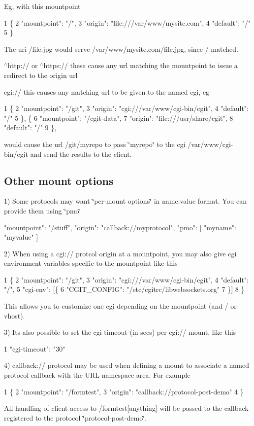 Eg, with this mountpoint 
\begin{DoxyCode}
1 \{
2  "mountpoint": "/",
3  "origin": "file:///var/www/mysite.com",
4  "default": "/"
5 \}
\end{DoxyCode}
 The uri /file.jpg would serve /var/www/mysite.com/file.\+jpg, since / matched.


\begin{DoxyItemize}
\item $^\wedge$http\+:// or $^\wedge$https\+:// these cause any url matching the mountpoint to issue a redirect to the origin url
\item cgi\+:// this causes any matching url to be given to the named cgi, eg 
\begin{DoxyCode}
1 \{
2  "mountpoint": "/git",
3  "origin": "cgi:///var/www/cgi-bin/cgit",
4  "default": "/"
5 \}, \{
6  "mountpoint": "/cgit-data",
7  "origin": "file:///usr/share/cgit",
8  "default": "/"
9 \},
\end{DoxyCode}
 would cause the url /git/myrepo to pass \char`\"{}myrepo\char`\"{} to the cgi /var/www/cgi-\/bin/cgit and send the results to the client.
\end{DoxyItemize}

\subsection*{Other mount options }

1) Some protocols may want \char`\"{}per-\/mount options\char`\"{} in name\+:value format. You can provide them using \char`\"{}pmo\char`\"{} \begin{DoxyVerb}           {
            "mountpoint": "/stuff",
            "origin": "callback://myprotocol",
            "pmo": [{
                    "myname": "myvalue"
            }]
           }
\end{DoxyVerb}


2) When using a cgi\+:// protcol origin at a mountpoint, you may also give cgi environment variables specific to the mountpoint like this 
\begin{DoxyCode}
1 \{
2  "mountpoint": "/git",
3  "origin": "cgi:///var/www/cgi-bin/cgit",
4  "default": "/",
5  "cgi-env": [\{
6          "CGIT\_CONFIG": "/etc/cgitrc/libwebsockets.org"
7  \}]
8 \}
\end{DoxyCode}
 This allows you to customize one cgi depending on the mountpoint (and / or vhost).

3) It\textquotesingle{}s also possible to set the cgi timeout (in secs) per cgi\+:// mount, like this 
\begin{DoxyCode}
1 "cgi-timeout": "30"
\end{DoxyCode}
 4) {\ttfamily callback\+://} protocol may be used when defining a mount to associate a named protocol callback with the U\+RL namespace area. For example 
\begin{DoxyCode}
1 \{
2  "mountpoint": "/formtest",
3  "origin": "callback://protocol-post-demo"
4 \}
\end{DoxyCode}
 All handling of client access to /formtest\mbox{[}anything\mbox{]} will be passed to the callback registered to the protocol \char`\"{}protocol-\/post-\/demo\char`\"{}.

